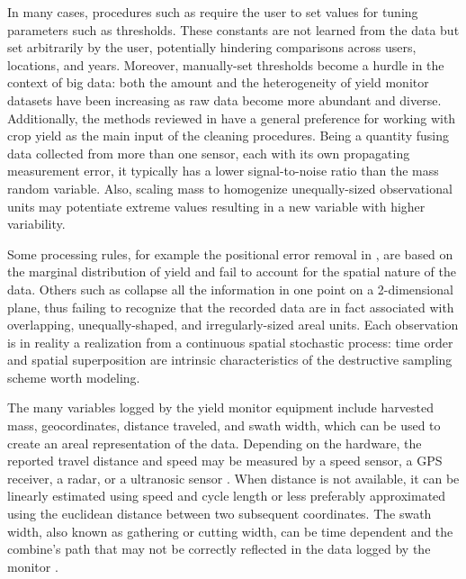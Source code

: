 In many cases, procedures such as \citep{Vega2019} require the user to
set values for tuning parameters such as thresholds. These constants
are not learned from the data but set arbitrarily by the user,
potentially hindering comparisons across users, locations, and
years. Moreover, manually-set thresholds become a hurdle in the
context of big data: both the amount and the heterogeneity of yield
monitor datasets have been increasing as raw data become more abundant
and diverse. Additionally, the methods reviewed in \citep{Lyle2013}
have a general preference for working with crop yield as the main
input of the cleaning procedures. Being a quantity fusing data
collected from more than one sensor, each with its own propagating
measurement error, it typically has a lower signal-to-noise ratio than
the mass random variable. Also, scaling mass to homogenize
unequally-sized observational units may potentiate extreme values
resulting in a new variable with higher variability.

Some processing rules, for example the positional error removal in
\citep{Blackmore1999}, are based on the marginal distribution of yield
and fail to account for the spatial nature of the data. Others such as
\citep{Leroux2018, Vega2019} collapse all the information in one
point on a 2-dimensional plane, thus failing to recognize that the
recorded data are in fact associated with overlapping,
unequally-shaped, and irregularly-sized areal units. Each observation
is in reality a realization from a continuous spatial stochastic
process: time order and spatial superposition are intrinsic
characteristics of the destructive sampling scheme worth modeling.

The many variables logged by the yield monitor equipment include
harvested mass, geocordinates, distance traveled, and swath width,
which can be used to create an areal representation of the
data. Depending on the hardware, the reported travel distance and
speed may be measured by a speed sensor, a GPS receiver, a radar, or a
ultranosic sensor \citep{Mulla2013}. When distance is not available,
it can be linearly estimated using speed and cycle length or less
preferably approximated using the euclidean distance between two
subsequent coordinates. The swath width, also known as gathering or
cutting width, can be time dependent and the combine's path that may
not be correctly reflected in the data logged by the monitor
\citep{Ross2008}.


